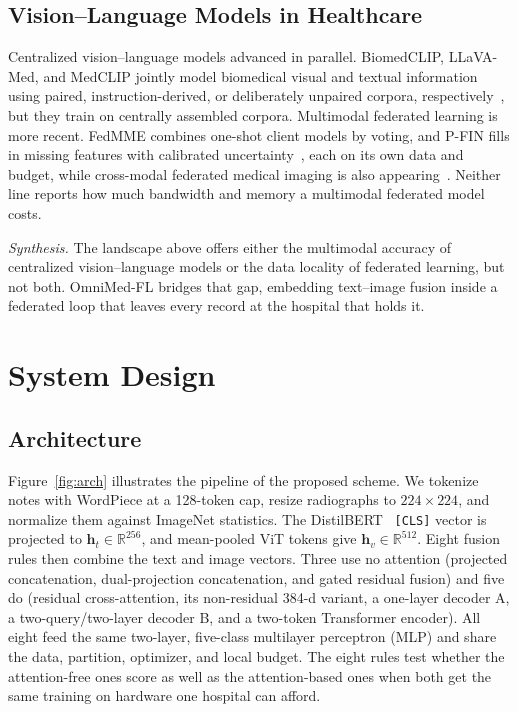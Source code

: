 \documentclass[letterpaper, conference]{IEEEtran}
\begin{document}
\subsection{Vision--Language Models in Healthcare}
Centralized vision--language models advanced in parallel. BiomedCLIP, LLaVA-Med, and
MedCLIP jointly model biomedical visual and textual information using paired,
instruction-derived, or deliberately unpaired corpora,
respectively~\cite{Zhang2025biomedclip,Li2023llavamed,Wang2022medclip}, but they
train on centrally assembled corpora. Multimodal federated learning is
more recent. FedMME combines one-shot client models by voting, and P-FIN fills in
missing features with calibrated
uncertainty~\cite{Wang2025fedmme,Shahid2026pfin}, each on its own data and budget,
while cross-modal federated medical imaging is also
appearing~\cite{Yan2024crossmodal}.
Neither line reports how much bandwidth and memory a multimodal federated model
costs. 

\textit{Synthesis.} The landscape above offers either the multimodal accuracy of
centralized vision--language models or the data locality of federated learning, but
not both. OmniMed-FL bridges that gap, embedding text--image fusion inside a
federated loop that leaves every record at the hospital that holds it.

\section{System Design}

\subsection{Architecture}

Figure~\ref{fig:arch} illustrates the pipeline of the proposed scheme. We tokenize notes with WordPiece at
a 128-token cap, resize radiographs to $224{\times}224$, and normalize them
against ImageNet statistics. The DistilBERT~\cite{Sanh2019} \texttt{[CLS]} vector
is projected to $\mathbf{h}_t\!\in\!\mathbb{R}^{256}$, and mean-pooled ViT tokens
give $\mathbf{h}_v\!\in\!\mathbb{R}^{512}$. Eight fusion rules then combine
the text and image vectors. Three use no attention (projected concatenation,
dual-projection concatenation, and gated residual fusion) and five do (residual
cross-attention, its non-residual 384-d variant, a one-layer decoder A, a
two-query/two-layer decoder B, and a two-token Transformer encoder). All eight feed
the same two-layer, five-class multilayer perceptron
(MLP) and share the data, partition, optimizer, and local budget. The eight rules test
whether the attention-free ones score as well as the attention-based ones when both
get the same training on hardware one hospital can afford.
\end{document}
